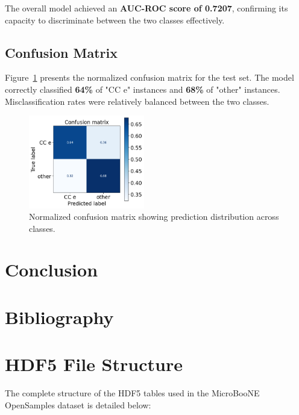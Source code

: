 \documentclass{pracalicmgr}
\begin{document}
The overall model achieved an \textbf{AUC-ROC score of 0.7207}, confirming its capacity to discriminate between the two classes effectively.

\subsection{Confusion Matrix}

Figure~\ref{fig:conf_matrix} presents the normalized confusion matrix for the test set. The model correctly classified \textbf{64\%} of "CC e" instances and \textbf{68\%} of "other" instances. Misclassification rates were relatively balanced between the two classes.

\begin{figure}[H]
    \centering
    \includegraphics[width=0.45\textwidth]{src/tranformerMatrixFinal.png}
    \caption{Normalized confusion matrix showing prediction distribution across classes.}
    \label{fig:conf_matrix}
\end{figure}


\section{Conclusion}

\newpage

\section{Bibliography}




\appendix

\section{HDF5 File Structure}
\label{app:hdf5_structure}

The complete structure of the HDF5 tables used in the MicroBooNE OpenSamples dataset is detailed below:
\end{document}
